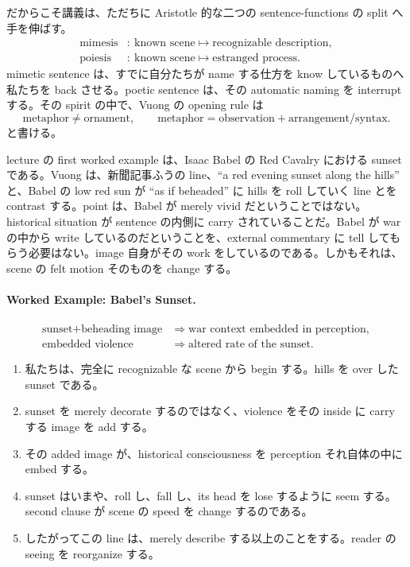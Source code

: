 だからこそ講義は、ただちに Aristotle 的な二つの sentence-functions の split へ手を伸ばす。
\begin{align}
\text{mimesis} &:\ \text{known scene} \mapsto \text{recognizable description},\\
\text{poiesis} &:\ \text{known scene} \mapsto \text{estranged process}.
\end{align}
mimetic sentence は、すでに自分たちが name する仕方を know しているものへ私たちを back させる。poetic sentence は、その automatic naming を interrupt する。その spirit の中で、Vuong の opening rule は
\begin{equation}
\text{metaphor} \neq \text{ornament}, \qquad \text{metaphor} = \text{observation} + \text{arrangement/syntax}.
\end{equation}
と書ける。

lecture の first worked example は、Isaac Babel の Red Cavalry における sunset である。Vuong は、新聞記事ふうの line、``a red evening sunset along the hills'' と、Babel の low red sun が ``as if beheaded'' に hills を roll していく line とを contrast する。point は、Babel が merely vivid だということではない。historical situation が sentence の内側に carry されていることだ。Babel が war の中から write しているのだということを、external commentary に tell してもらう必要はない。image 自身がその work をしているのである。しかもそれは、scene の felt motion そのものを change する。

\paragraph{Worked Example: Babel's Sunset.}
\begin{align}
\text{sunset} + \text{beheading image} &\Longrightarrow \text{war context embedded in perception},\\
\text{embedded violence} &\Longrightarrow \text{altered rate of the sunset}.
\end{align}
\begin{enumerate}
\item 私たちは、完全に recognizable な scene から begin する。hills を over した sunset である。
\item sunset を merely decorate するのではなく、violence をその inside に carry する image を add する。
\item その added image が、historical consciousness を perception それ自体の中に embed する。
\item sunset はいまや、roll し、fall し、its head を lose するように seem する。second clause が scene の speed を change するのである。
\item したがってこの line は、merely describe する以上のことをする。reader の seeing を reorganize する。
\end{enumerate}

